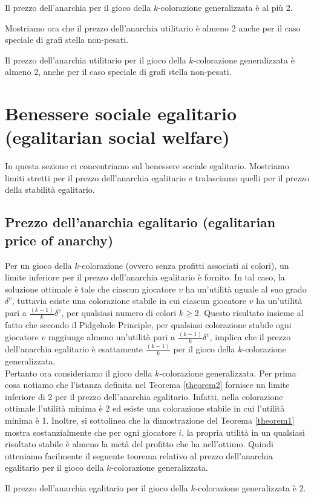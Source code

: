 \begin{theorem}
\label{theorem1}
	Il prezzo dell'anarchia per il gioco della \(k\)-colorazione generalizzata è al più 2. 
\end{theorem}

Mostriamo ora che il prezzo dell'anarchia utilitario è almeno 2 anche per il caso speciale di grafi stella non-pesati.\\

\begin{theorem}
\label{theorem2}
	Il prezzo dell'anarchia utilitario per il gioco della \(k\)-colorazione generalizzata è almeno 2, anche per il caso speciale di grafi stella non-pesati.
\end{theorem}

\section{Benessere sociale egalitario (egalitarian social welfare)}
\justify
In questa sezione ci concentriamo sul benessere sociale egalitario. Mostriamo limiti stretti per il prezzo dell'anarchia egalitario e tralasciamo quelli per il prezzo della stabilità egalitario.\\

\subsection{Prezzo dell'anarchia egalitario (egalitarian price of anarchy)}
\justify
Per un gioco della \(k\)-colorazione (ovvero senza profitti associati ai colori), un limite inferiore per il prezzo dell'anarchia egalitario è fornito. In tal caso, la soluzione ottimale è tale che ciascun giocatore \(v\) ha un'utilità uguale al suo grado \(\delta^v\), tuttavia esiste una colorazione stabile in cui ciascun giocatore \(v\) ha un'utilità pari a \(\frac{(k-1)}{k} \delta^v\), per qualsiasi numero di colori \(k \geq 2\). Questo risultato insieme al fatto che secondo il Pidgehole Principle, per qualsiasi colorazione stabile ogni giocatore \(v\) raggiunge almeno un'utilità pari a \(\frac{(k-1)}{k} \delta^v\), implica che il prezzo dell'anarchia egalitario è esattamente \(\frac{(k-1)}{k}\) per il gioco della \(k\)-colorazione generalizzata.\\
Pertanto ora consideriamo il gioco della \(k\)-colorazione generalizzata. Per prima cosa notiamo che l'istanza definita nel Teorema \ref{theorem2} fornisce un limite inferiore di 2 per il prezzo dell'anarchia egalitario. Infatti, nella colorazione ottimale l'utilità minima è 2 ed esiste una colorazione stabile in cui l'utilità minima è 1. Inoltre, si sottolinea che la dimostrazione del Teorema \ref{theorem1} mostra sostanzialmente che per ogni giocatore \(i\), la propria utilità in un qualsiasi risultato stabile è almeno la metà del profitto che ha nell'ottimo. Quindi otteniamo facilmente il seguente teorema relativo al prezzo dell'anarchia egalitario per il gioco della \(k\)-colorazione generalizzata.

\begin{theorem}
\label{theorem3}
	Il prezzo dell'anarchia egalitario per il gioco della \(k\)-colorazione generalizzata è 2.
\end{theorem}